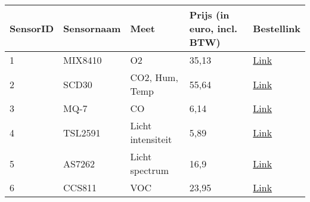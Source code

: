 \begin{table}[H]
\centering
\begin{tabular}{lllll}
\hline
\multicolumn{1}{|l|}{SensorID} & \multicolumn{1}{l|}{Sensornaam}       & \multicolumn{1}{l|}{Meet}                & \multicolumn{1}{l|}{Prijs (in euro, incl. BTW)} & \multicolumn{1}{l|}{Bestellink}                                                                                                                       \\ \hline
\multicolumn{1}{|l|}{1}        & \multicolumn{1}{l|}{MIX8410}          & \multicolumn{1}{l|}{O2}                  & \multicolumn{1}{l|}{35,13}                      & \multicolumn{1}{l|}{\href{https://nl.mouser.com/ProductDetail/Seeed-Studio/101990680?qs=DPoM0jnrROWBX\%2FfANB1IYw\%3D\%3D}{Link}}                     \\ \hline
\multicolumn{1}{|l|}{2}        & \multicolumn{1}{l|}{SCD30}            & \multicolumn{1}{l|}{CO2,   Hum, Temp}    & \multicolumn{1}{l|}{55,64}                      & \multicolumn{1}{l|}{\href{https://nl.rs-online.com/web/p/temperature-humidity-sensor-ics/1720552/}{Link}}                                             \\ \hline
\multicolumn{1}{|l|}{3}        & \multicolumn{1}{l|}{MQ-7}             & \multicolumn{1}{l|}{CO}                  & \multicolumn{1}{l|}{6,14}                       & \multicolumn{1}{l|}{\href{https://nl.mouser.com/ProductDetail/474-SEN-09403}{Link}}                                                                   \\ \hline
\multicolumn{1}{|l|}{4}        & \multicolumn{1}{l|}{TSL2591}          & \multicolumn{1}{l|}{Licht   intensiteit} & \multicolumn{1}{l|}{5,89}                       & \multicolumn{1}{l|}{\href{https://nl.mouser.com/ProductDetail/Adafruit/1980?qs=sGAEpiMZZMsKEdP9slC0YSnuTSFmm1LYraEQV\%252B1EsJM\%3D}{Link}}           \\ \hline
\multicolumn{1}{|l|}{5}        & \multicolumn{1}{l|}{AS7262}           & \multicolumn{1}{l|}{Licht   spectrum}    & \multicolumn{1}{l|}{16,9}                       & \multicolumn{1}{l|}{\href{https://nl.mouser.com/ProductDetail/Adafruit/3779?qs=\%2Fha2pyFaduhIK8PZSZbRzZsXMtLLCRlN2lsYwgiwgTg\%}{Link}}               \\ \hline
\multicolumn{1}{|l|}{6}        & \multicolumn{1}{l|}{CCS811}           & \multicolumn{1}{l|}{VOC}                 & \multicolumn{1}{l|}{23,95}                      & \multicolumn{1}{l|}{\href{https://www.kiwi-electronics.com/nl/adafruit-ccs811-air-quality-sensor-breakout-voc-eco2-3205?search=CCS811}{Link}}         \\ \hline

\end{tabular}
\end{table}
